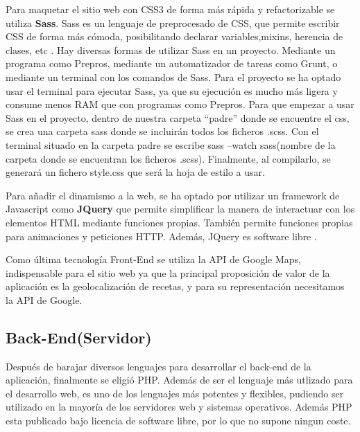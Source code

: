 \vspace{5 mm}

Para maquetar el sitio web con CSS3 de forma más rápida y refactorizable se utiliza \textbf{Sass}. Sass es un lenguaje de preprocesado de CSS, que permite escribir CSS de forma más cómoda, posibilitando declarar variables,mixins, herencia de clases, etc \cite{sass-doc}. Hay diversas formas de utilizar Sass en un proyecto. Mediante un programa como Prepros, mediante un automatizador de tareas como Grunt, o mediante un terminal con los comandos de Sass. Para el proyecto se ha optado usar el terminal para ejecutar Sass, ya que su ejecución es mucho más ligera y consume menos RAM que con programas como Prepros. Para que empezar a usar Sass en el proyecto, dentro de nuestra carpeta ``padre'' donde se encuentre el css, se crea una carpeta sass donde se incluirán todos los ficheros .scss. Con el terminal situado en la carpeta padre se escribe sass --watch sass(nombre de la carpeta donde se encuentran los ficheros .scss). Finalmente, al compilarlo, se generará un fichero style.css que será la hoja de estilo a usar.

\vspace{5 mm}

Para añadir el dinamismo a la web, se ha optado por utilizar un framework de Javascript como \textbf{JQuery} que permite simplificar la manera de interactuar con los elementos HTML mediante funciones propias. También permite funciones propias para animaciones y peticiones HTTP. Además, JQuery es software libre \cite{jquery-doc}.

\vspace{5 mm}

Como última tecnología Front-End se utiliza la API de Google Maps, indispensable para el sitio web ya que la principal proposición de valor de la aplicación es la geolocalización de recetas, y para su representación necesitamos la API de Google.


\subsection{Back-End(Servidor)}

Después de barajar diversos lenguajes para desarrollar el back-end de la aplicación, finalmente se eligió PHP. Además de ser el lenguaje más utlizado para el desarrollo web, es uno de los lenguajes más potentes y flexibles, pudiendo ser utilizado en la mayoría de los servidores web y sistemas operativos. Además PHP esta publicado bajo licencia de software libre, por lo que no supone ningun coste.


